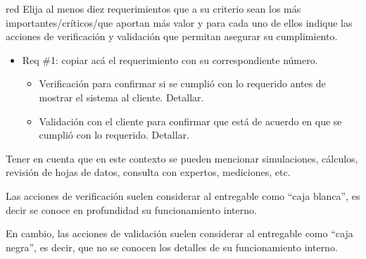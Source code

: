 \begin{consigna}{red}
	Elija al menos diez requerimientos que a su criterio sean los más importantes/críticos/que aportan más valor y para cada uno de ellos indique las acciones de verificación y validación que permitan asegurar su cumplimiento.

	\begin{itemize}
		\item Req \#1: copiar acá el requerimiento con su correspondiente número.

		      \begin{itemize}
			      \item Verificación para confirmar si se cumplió con lo requerido antes de mostrar el
			            sistema al cliente. Detallar.
			      \item Validación con el cliente para confirmar que está de acuerdo en que se cumplió
			            con lo requerido. Detallar.
		      \end{itemize}

	\end{itemize}

	Tener en cuenta que en este contexto se pueden mencionar simulaciones,
	cálculos, revisión de hojas de datos, consulta con expertos, mediciones, etc.

	Las acciones de verificación suelen considerar al entregable como ``caja
	blanca'', es decir se conoce en profundidad su funcionamiento interno.

	En cambio, las acciones de validación suelen considerar al entregable como
	``caja negra'', es decir, que no se conocen los detalles de su funcionamiento
	interno.

\end{consigna}